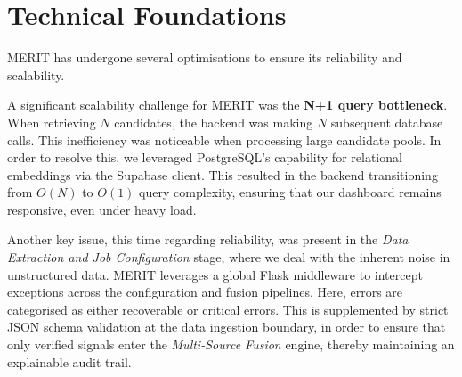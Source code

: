 \section{Technical Foundations}
MERIT has undergone several optimisations to ensure its reliability and scalability.

A significant scalability challenge for MERIT was the \textbf{N+1 query bottleneck}.
When retrieving $N$ candidates, the backend was making $N$ subsequent database calls.
This inefficiency was noticeable when processing large candidate pools.
In order to resolve this, we leveraged PostgreSQL's capability for relational embeddings
via the Supabase client. This resulted in the backend transitioning from $O(N)$ to $O(1)$
query complexity, ensuring that our dashboard remains responsive, even under
heavy load.

Another key issue, this time regarding reliability, was present in the
\textit{Data Extraction and Job Configuration} stage, where we deal with the inherent noise in
unstructured data. MERIT leverages a global Flask middleware to intercept exceptions across the
configuration and fusion pipelines. Here, errors are categorised as either recoverable or
critical errors. This is supplemented by strict JSON schema validation at the data ingestion
boundary, in order to ensure that only verified signals enter the \textit{Multi-Source Fusion}
engine, thereby maintaining an explainable audit trail.
